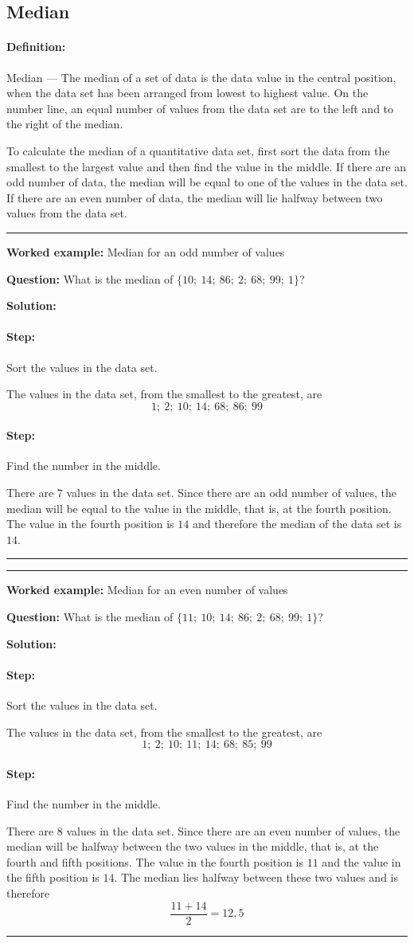 \documentclass[a4paper,11pt]{report}
\def\Definition#1#2{\paragraph{Definition:} #1 --- #2}
\newenvironment{wex}[3]%
{\rule{\linewidth}{0.5mm}
\textbf{Worked example:} #1

\textbf{Question:} #2

\textbf{Solution:} #3}%
{\rule{\linewidth}{0.5mm}}
\newcommand{\westep}[1]{\paragraph{Step:} #1}
\begin{document}
\subsection{Median}
\Definition{Median}{
  The median of a set of data is the data value in the central
  position, when the data set has been arranged from lowest to highest
  value. On the number line, an equal number of values from the data
  set are to the left and to the right of the median.}

To calculate the median of a quantitative data set, first sort the
data from the smallest to the largest value and then find the value in
the middle. If there are an odd number of data, the median will be
equal to one of the values in the data set. If there are an even
number of data, the median will lie halfway between two values from
the data set.

\begin{wex}{Median for an odd number of values}{
  What is the median of $\{10;\ 14;\ 86;\ 2;\ 68;\ 99;\ 1\}$?
}{
  \westep{Sort the values in the data set.}

  The values in the data set, from the smallest to the greatest, are
  \begin{equation}
    1;\ 2;\ 10;\ 14;\ 68;\ 86;\ 99
  \end{equation}

  \westep{Find the number in the middle.}

  There are $7$ values in the data set. Since there are an odd number
  of values, the median will be equal to the value in the middle, that
  is, at the fourth position. The value in the fourth position is
  $14$ and therefore the median of the data set is $14$.
}
\end{wex}

\begin{wex}{Median for an even number of values}{
  What is the median of $\{11;\ 10;\ 14;\ 86;\ 2;\ 68;\ 99;\ 1\}$?
}{
  \westep{Sort the values in the data set.}

  The values in the data set, from the smallest to the greatest, are
  \begin{equation}
    1;\ 2;\ 10;\ 11;\ 14;\ 68;\ 85;\ 99
  \end{equation}

  \westep{Find the number in the middle.}

  There are $8$ values in the data set. Since there are an even number
  of values, the median will be halfway between the two values in the
  middle, that is, at the fourth and fifth positions. The value in the
  fourth position is $11$ and the value in the fifth position is
  $14$. The median lies halfway between these two values and is
  therefore
  \begin{equation}
    \frac{11+14}{2} = 12,5
  \end{equation}
}
\end{wex}
\end{document}
